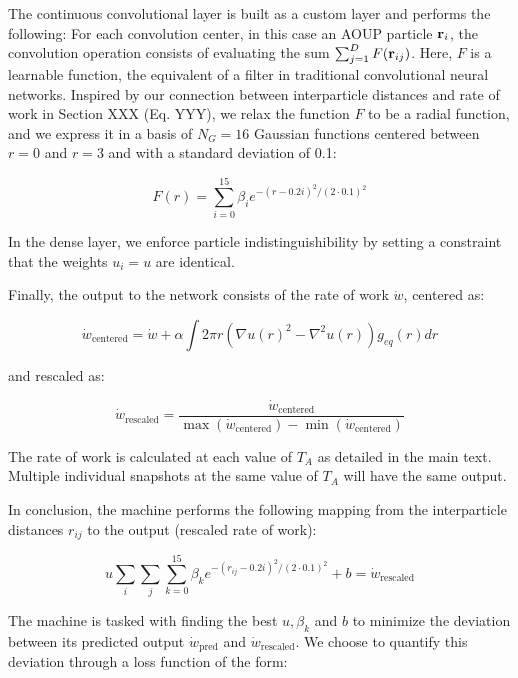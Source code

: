 \documentclass[amsmath,preprintnumbers,10pt,nofootinbib,prl,twocolumn]{revtex4-1}
\begin{document}
The continuous convolutional layer is built as a custom layer and performs the following:
For each convolution center, in this case an AOUP particle ${\bf r}_i$, the convolution operation consists of evaluating the sum $\sum_{j=1}^{D} F({\bf r}_{ij})$. Here, $F$ is a learnable function, the equivalent of a filter in traditional convolutional neural networks.  Inspired by our connection between interparticle distances and rate of work in Section XXX (Eq. YYY), we relax the function $F$ to be a radial function, and we express it in a basis of $N_G=16$ Gaussian functions centered between $r=0$ and $r=3$ and with a standard deviation of 0.1:

\begin{equation}
    F(r) = \sum_{i=0}^{15} \beta_i e^{-(r-0.2 i)^2/(2\cdot 0.1)^2}
\end{equation}

In the dense layer, we enforce particle indistinguishibility by setting a constraint that the weights $u_i = u $ are identical. 

Finally, the output to the network consists of the rate of work $\dot{w}$, centered as:

\begin{equation}
    \dot{w}_{\text{centered}} = \dot{w} + \alpha \int 2\pi r (\nabla u(r)^2 - \nabla^2 u(r)) g_{eq}(r) dr
\end{equation}

and rescaled as:

\begin{equation}
    \dot{w}_{\text{rescaled}} = \dfrac{\dot{w}_{\text{centered}}}{\max(\dot{w}_{\text{centered}}) - \min(\dot{w}_{\text{centered}} )}
\end{equation}

The rate of work is calculated at each value of $T_A$ as detailed in the main text. Multiple individual snapshots at the same value of $T_A$ will have the same output.

In conclusion, the machine performs the following mapping from the interparticle distances $r_{ij}$ to the output (rescaled rate of work):

\begin{equation}
     u \sum_i \sum_{j} \sum_{k=0}^{15} \beta_k e^{-(r_{ij}-0.2 i)^2/(2\cdot 0.1)^2} + b = \dot{w}_{\text{rescaled}}
\end{equation}

The machine is tasked with finding the best $u, \beta_k$ and $b$ to minimize the deviation between its predicted output $\dot{w}_{\text{pred}}$ and $\dot{w}_{\text{rescaled}}$. We choose to quantify this deviation through a loss function of the form:
\end{document}
